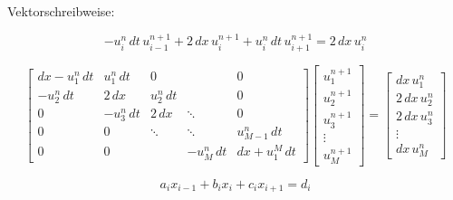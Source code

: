 \documentclass[border=10pt]{article}
\begin{document}
Vektorschreibweise:

\begin{equation}
 -u_{i}^{n} \, dt \, u_{i-1}^{n+1} +  2 \, dx \,  u_{i}^{n+1} + u_{i}^{n} \, dt \, u_{i+1}^{n+1}=  2 \, dx \, u_{i}^{n}
\end{equation}



\begin{equation}
\left[{\begin{matrix}
{dx- u_{1}^{n}\, dt}&{ u_{1}^{n} \, dt}&{0}&{}&{0}\\[5pt]
{-u_{2}^{n} \, dt}&{ 2 \, dx}&{ u_{2}^{n} \, dt}&{}&{0}\\[5pt]
{0}&{-u_{3}^{n} \, dt}&{ 2 \, dx}&\ddots &{0}\\[5pt]
{0}&{0}&\ddots &\ddots &{ u_{M-1}^{n} \, dt}\\[5pt]
{0}&{0}&{}&{-u_{M}^{n} \, dt}&{dx + u_{1}^{M}\, dt}
\end{matrix}}
\right]\left[{\begin{matrix}
{ u_{1}^{n+1}}\\[5pt]
{ u_{2}^{n+1}}\\[5pt]
{ u_{3}^{n+1}}\\[5pt]
\vdots \\[5pt]
{ u_{M}^{n+1}}
\end{matrix}}\right]
=\left[{\begin{matrix}
{dx \, u_{1}^{n}}\\[5pt]
{ 2 \, dx \, u_{2}^{n}}\\[5pt]
{ 2 \, dx \, u_{3}^{n}}\\[5pt]
\vdots \\[5pt]
{dx \, u_{M}^{n}}
\end{matrix}}\right]
  \end{equation}

  \begin{equation}
    a_{i}x_{{i-1}}+b_{i}x_{i}+c_{i}x_{{i+1}}=d_{i}
  \end{equation}
\end{document}
